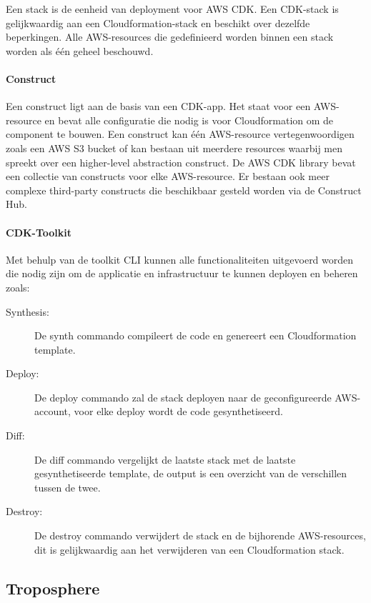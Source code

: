 Een stack is de eenheid van deployment voor AWS CDK.
Een CDK-stack is gelijkwaardig aan een Cloudformation-stack en beschikt over dezelfde beperkingen.
Alle AWS-resources die gedefinieerd worden binnen een stack worden als één geheel beschouwd.

\paragraph{Construct}

Een construct ligt aan de basis van een CDK-app.
Het staat voor een AWS-resource en bevat alle configuratie die nodig is voor Cloudformation om de component te bouwen.
Een construct kan één AWS-resource vertegenwoordigen zoals een AWS S3 bucket of kan bestaan uit meerdere resources waarbij men spreekt over een higher-level abstraction construct.
De AWS CDK library bevat een collectie van constructs voor elke AWS-resource.
Er bestaan ook meer complexe third-party constructs die beschikbaar gesteld worden via de Construct Hub.

\paragraph{CDK-Toolkit}

Met behulp van de toolkit CLI kunnen alle functionaliteiten uitgevoerd worden die nodig zijn om de applicatie en infrastructuur te kunnen deployen en beheren zoals:

\begin{description}
    \item[Synthesis:] De synth commando compileert de code en genereert een Cloudformation template.
    \item[Deploy:] De deploy commando zal de stack deployen naar de geconfigureerde AWS-account, voor elke deploy wordt de code gesynthetiseerd.
    \item[Diff:] De diff commando vergelijkt de laatste stack met de laatste gesynthetiseerde template, de output is een overzicht van de verschillen tussen de twee.
    \item[Destroy:] De destroy commando verwijdert de stack en de bijhorende AWS-resources, dit is gelijkwaardig aan het verwijderen van een Cloudformation stack.
\end{description}

\subsection{Troposphere}
\label{sec:service-troposphere}